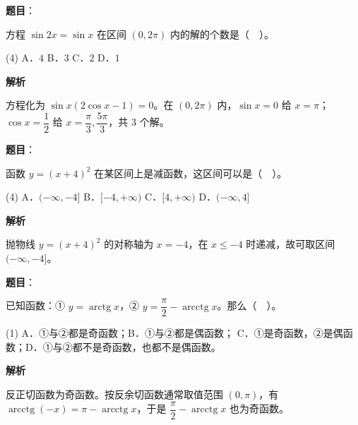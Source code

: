 \begin{answer}

\textbf{题目}：

方程 $\sin 2x=\sin x$ 在区间 $(0,2\pi)$ 内的解的个数是（　）。

\begin{gkopts}(4)
\task A．$4$
\task B．$3$
\task C．$2$
\task D．$1$
\end{gkopts}

\textbf{解析}

方程化为 $\sin x(2\cos x-1)=0$。在 $(0,2\pi)$ 内，$\sin x=0$ 给 $x=\pi$；$\cos x=\dfrac12$ 给 $x=\dfrac\pi3,\dfrac{5\pi}3$，共 $3$ 个解。


\end{answer}
\begin{answer}

\textbf{题目}：

函数 $y=(x+4)^2$ 在某区间上是减函数，这区间可以是（　）。

\begin{gkopts}(4)
\task A．$(-\infty,-4]$
\task B．$[-4,+\infty)$
\task C．$[4,+\infty)$
\task D．$(-\infty,4]$
\end{gkopts}

\textbf{解析}

抛物线 $y=(x+4)^2$ 的对称轴为 $x=-4$，在 $x\le-4$ 时递减，故可取区间 $(-\infty,-4]$。


\end{answer}
\begin{answer}

\textbf{题目}：

已知函数：① $y=\operatorname{arctg}x$，② $y=\dfrac\pi2-\operatorname{arcctg}x$。那么（　）。

\begin{gkopts}(1)
\task A．①与②都是奇函数；B．①与②都是偶函数；
\task C．①是奇函数，②是偶函数；D．①与②都不是奇函数，也都不是偶函数。
\end{gkopts}

\textbf{解析}

反正切函数为奇函数。按反余切函数通常取值范围 $(0,\pi)$，有 $\operatorname{arcctg}(-x)=\pi-\operatorname{arcctg}x$，于是 $\dfrac\pi2-\operatorname{arcctg}x$ 也为奇函数。


\end{answer}
